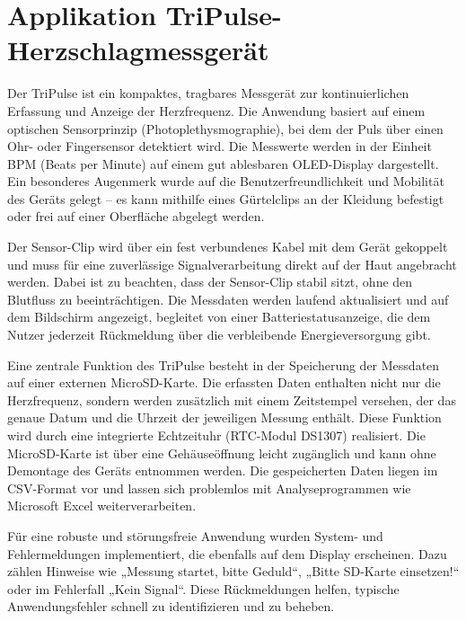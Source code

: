%

%

\chapter{Applikation TriPulse-Herzschlagmessgerät}

Der TriPulse ist ein kompaktes, tragbares Messgerät zur kontinuierlichen Erfassung und Anzeige der Herzfrequenz. Die Anwendung basiert auf einem optischen Sensorprinzip (Photoplethysmographie), bei dem der Puls über einen Ohr- oder Fingersensor detektiert wird. Die Messwerte werden in der Einheit BPM (Beats per Minute) auf einem gut ablesbaren OLED-Display dargestellt. Ein besonderes Augenmerk wurde auf die Benutzerfreundlichkeit und Mobilität des Geräts gelegt – es kann mithilfe eines Gürtelclips an der Kleidung befestigt oder frei auf einer Oberfläche abgelegt werden.

Der Sensor-Clip wird über ein fest verbundenes Kabel mit dem Gerät gekoppelt und muss für eine zuverlässige Signalverarbeitung direkt auf der Haut angebracht werden. Dabei ist zu beachten, dass der Sensor-Clip stabil sitzt, ohne den Blutfluss zu beeinträchtigen. Die Messdaten werden laufend aktualisiert und auf dem Bildschirm angezeigt, begleitet von einer Batteriestatusanzeige, die dem Nutzer jederzeit Rückmeldung über die verbleibende Energieversorgung gibt.

Eine zentrale Funktion des TriPulse besteht in der Speicherung der Messdaten auf einer externen MicroSD-Karte. Die erfassten Daten enthalten nicht nur die Herzfrequenz, sondern werden zusätzlich mit einem Zeitstempel versehen, der das genaue Datum und die Uhrzeit der jeweiligen Messung enthält. Diese Funktion wird durch eine integrierte Echtzeituhr (RTC-Modul DS1307) realisiert. Die MicroSD-Karte ist über eine Gehäuseöffnung leicht zugänglich und kann ohne Demontage des Geräts entnommen werden. Die gespeicherten Daten liegen im CSV-Format vor und lassen sich problemlos mit Analyseprogrammen wie Microsoft Excel weiterverarbeiten.

Für eine robuste und störungsfreie Anwendung wurden System- und Fehlermeldungen implementiert, die ebenfalls auf dem Display erscheinen. Dazu zählen Hinweise wie „Messung startet, bitte Geduld“, „Bitte SD-Karte einsetzen!“ oder im Fehlerfall „Kein Signal“. Diese Rückmeldungen helfen, typische Anwendungsfehler schnell zu identifizieren und zu beheben.

